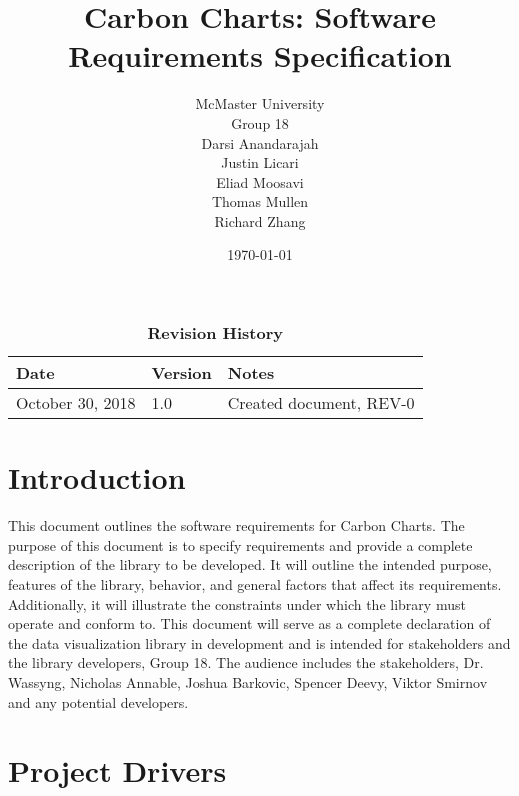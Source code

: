 \documentclass[12pt, titlepage]{article}
\title{Carbon Charts: Software Requirements Specification\\}
\author{
    McMaster University\\
    Group 18 \\
    Darsi Anandarajah \\
    Justin Licari \\
    Eliad Moosavi \\
    Thomas Mullen \\
    Richard Zhang \\
}
\date{\today}
\begin{document}
\maketitle

\tableofcontents
\listoftables
\listoffigures

\begin{table}[bp]
\caption{\bf Revision History}
\begin{tabularx}{\textwidth}{p{3cm}p{2cm}X}
\toprule {\bf Date} & {\bf Version} & {\bf Notes}\\
\midrule
October 30, 2018 & 1.0 & Created document, REV-0\\

\bottomrule
\end{tabularx}
\end{table}

\newpage


\section{Introduction}
This document outlines the software requirements for Carbon Charts. The purpose of this document is to specify requirements and provide a complete description of the library to be developed. It will outline the intended purpose, features of the library, behavior, and general factors that affect its requirements. Additionally, it will illustrate the constraints under which the library must operate and conform to. This document will serve as a complete declaration of the data visualization library in development and is intended for stakeholders and the library developers, Group 18. The audience includes the stakeholders, Dr. Wassyng, Nicholas Annable, Joshua Barkovic, Spencer Deevy, Viktor Smirnov and any potential developers. 



\section{Project Drivers}
\end{document}
